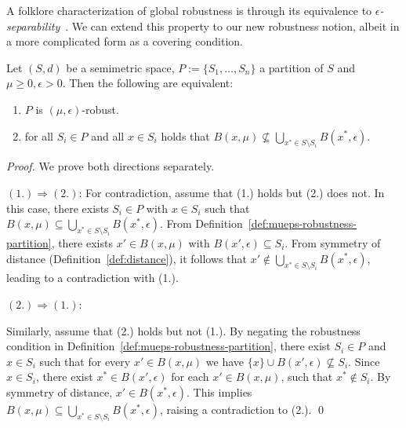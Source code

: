 A folklore characterization of global robustness is through its equivalence to \emph{$\epsilon$-separability}~\cite{yang2020closer,mangal2023certifying}. We can extend this property to our new robustness notion, albeit in a more complicated form as a covering condition. 
\begin{theorem}
\label{thm:separability}
    Let $(S,d)$ be a semimetric space, $P := \{S_1, \dots, S_n\}$ a partition of $S$ and $\mu \geq 0, \epsilon > 0$. Then the following are equivalent:
    \begin{enumerate}
        \item $P$ is $(\mu,\epsilon)$-robust.
        \item for all $S_i \in P$ and all $x \in S_i$ holds that $B(x, \mu) \not\subseteq \bigcup_{x^* \in S \setminus S_i} B(x^*, \epsilon)$.
    \end{enumerate}
\end{theorem}
\begin{proof}
    We prove both directions separately.

    $(1.) \Rightarrow (2.)$: 
    For contradiction, assume that (1.) holds but (2.) does not. In this case, there exists $S_i \in P$ with $x \in S_i$ such that $B(x,\mu) \subseteq \bigcup_{x^* \in S \setminus S_i} B(x^*, \epsilon)$. From Definition~\ref{def:mueps-robustness-partition}, there exists $x' \in B(x,\mu)$ with $B(x',\epsilon) \subseteq S_i$. From symmetry of distance (Definition~\ref{def:distance}), it follows that $x' \notin \bigcup_{x^* \in S \setminus S_i} B(x^*, \epsilon)$, leading to a contradiction with (1.).

    $(2.) \Rightarrow (1.)$:

    Similarly, assume that (2.) holds but not (1.). By negating the robustness condition in Definition~\ref{def:mueps-robustness-partition}, there exist $S_i \in P$ and $x \in S_i$ such that for every $x' \in B(x,\mu)$ we have $\{x\} \cup B(x',\epsilon) \not\subseteq S_i$.
    Since $x \in S_i$, there exist $x^* \in B(x', \epsilon)$ for each $x' \in B(x,\mu)$, such that $x^* \notin S_i$. By symmetry of distance, $x' \in B(x^*, \epsilon)$.
    This implies $B(x,\mu) \subseteq \bigcup_{x^* \in S \setminus S_i} B(x^*,\epsilon)$, raising a contradiction to (2.).
    \qed
\end{proof}

